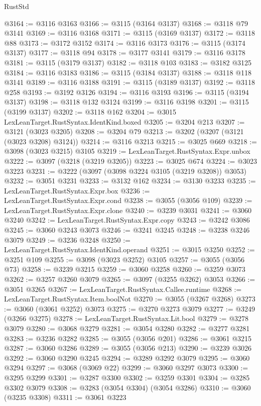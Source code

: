 \begin{lexlean}{RustStd}
\begin{coremodule}
{\begin{coremodule}
{{{{{{{{{{{{{{{{{{{{{{{{{{{{{{{{@3164 := @3116 @3163
@3166 := @3115 (@3164 @3137)
@3168 := @3118 @79 @3141
@3169 := @3116 @3168
@3171 := @3115 (@3169 @3137)
@3172 := @3118 @88
@3173 := @3172 @3152
@3174 := @3116 @3173
@3176 := @3115 (@3174 @3137)
@3177 := @3118 @94
@3178 := @3177 @3141
@3179 := @3116 @3178
@3181 := @3115 (@3179 @3137)
@3182 := @3118 @103
@3183 := @3182 @3125
@3184 := @3116 @3183
@3186 := @3115 (@3184 @3137)
@3188 := @3118 @118 @3141
@3189 := @3116 @3188
@3191 := @3115 (@3189 @3137)
@3192 := @3118 @258
@3193 := @3192 @3126
@3194 := @3116 @3193
@3196 := @3115 (@3194 @3137)
@3198 := @3118 @132 @3124
@3199 := @3116 @3198
@3201 := @3115 (@3199 @3137)
@3202 := @3118 @162
@3204 := @3015 LexLeanTarget.RustSyntax.IdentKind.boxed
@3205 := @3204 @213
@3207 := @3121 (@3023 @3205)
@3208 := @3204 @79
@3213 := @3202 (@3207 (@3121 (@3023 @3208) @3124))
@3214 := @3116 @3213
@3215 := @3025 @669
@3218 := @3098 (@3023 @3215) @3105
@3219 := LexLeanTarget.RustSyntax.Expr.unbox
@3222 := @3097 (@3218 (@3219 @3205))
@3223 := @3025 @674
@3224 := @3023 @3223
@3231 := @3222 (@3097 (@3098 @3224 @3105 (@3219 @3208)) @3053)
@3232 := @3051 @3231
@3233 := @3132 @162
@3234 := @3130 @3233
@3235 := LexLeanTarget.RustSyntax.Expr.box
@3236 := LexLeanTarget.RustSyntax.Expr.cond
@3238 := @3055 (@3056 @109)
@3239 := LexLeanTarget.RustSyntax.Expr.clone
@3240 := @3239 @3031
@3241 := @3060 @3240
@3242 := LexLeanTarget.RustSyntax.Expr.copy
@3243 := @3242 @3086
@3245 := @3060 @3243 @3073
@3246 := @3241 @3245
@3248 := @3238 @3246 @3079
@3249 := @3236 @3248
@3250 := LexLeanTarget.RustSyntax.IdentKind.operand
@3251 := @3015 @3250
@3252 := @3251 @109
@3255 := @3098 (@3023 @3252) @3105
@3257 := @3055 (@3056 @73)
@3258 := @3239 @3215
@3259 := @3060 @3258
@3260 := @3259 @3073
@3262 := @3257 @3260 @3079
@3265 := @3097 (@3255 @3262) @3053
@3266 := @3051 @3265
@3267 := LexLeanTarget.RustSyntax.Callee.runtime
@3268 := LexLeanTarget.RustSyntax.Item.boolNot
@3270 := @3055 (@3267 @3268)
@3273 := @3060 (@3061 @3252) @3073
@3275 := @3270 @3273 @3079
@3277 := @3249 (@3266 @3275)
@3278 := LexLeanTarget.RustSyntax.Lit.bool
@3279 := @3278 @3079
@3280 := @3068 @3279
@3281 := @3054 @3280
@3282 := @3277 @3281
@3283 := @3236 @3282
@3285 := @3055 (@3056 @201)
@3286 := @3061 @3215
@3287 := @3060 @3286
@3289 := @3055 (@3056 @213)
@3290 := @3239 @3026
@3292 := @3060 @3290 @3245
@3294 := @3289 @3292 @3079
@3295 := @3060 @3294
@3297 := @3068 (@3069 @22)
@3299 := @3060 @3297 @3073
@3300 := @3295 @3299
@3301 := @3287 @3300
@3302 := @3259 @3301
@3304 := @3285 @3302 @3079
@3308 := @3283 (@3054 @3304) (@3054 @3286)
@3310 := @3060 (@3235 @3308)
@3311 := @3061 @3223
}}}}}}}}}}}}}}}}}}}}}}}}}}}}}}}}
\end{coremodule}}
\end{coremodule}
\end{lexlean}
